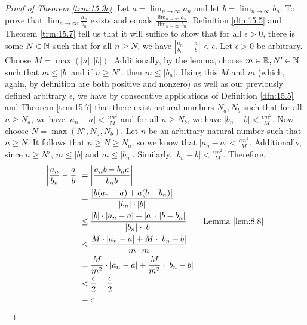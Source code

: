 \documentclass[../main.tex]{subfiles}
\begin{document}
\begin{theorem}
\begin{enumerate}[resume,label={\textup{(}\alph*\textup{)}},ref={\thetheorem\alph*}]
        \begin{proof}[Proof of Theorem \ref{trm:15.9c}]
            Let $a=\lim_{n\to\infty}a_n$ and let $b=\lim_{n\to\infty}b_n$. To prove that $\lim_{n\to\infty}\frac{a_n}{b_n}$ exists and equals $\frac{\lim_{n\to\infty}a_n}{\lim_{n\to\infty}b_n}$, Definition \ref{dfn:15.5} and Theorem \ref{trm:15.7} tell us that it will suffice to show that for all $\epsilon>0$, there is some $N\in\mathbb{N}$ such that for all $n\geq N$, we have $|\frac{a_n}{b_n}-\frac{a}{b}|<\epsilon$. Let $\epsilon>0$ be arbitrary. Choose $M=\max(|a|,|b|)$. Additionally, by the lemma, choose $m\in\mathbb{R},N'\in\mathbb{N}$ such that $m\leq|b|$ and if $n\geq N'$, then $m\leq|b_n|$. Using this $M$ and $m$ (which, again, by definition are both positive and nonzero) as well as our previously defined arbitrary $\epsilon$, we have by consecutive applications of Definition \ref{dfn:15.5} and Theorem \ref{trm:15.7} that there exist natural numbers $N_a,N_b$ such that for all $n\geq N_a$, we have $|a_n-a|<\frac{\epsilon m^2}{M}$ and for all $n\geq N_b$, we have $|b_n-b|<\frac{\epsilon m^2}{M}$. Now choose $N=\max(N',N_a,N_b)$. Let $n$ be an arbitrary natural number such that $n\geq N$. It follows that $n\geq N\geq N_a$, so we know that $|a_n-a|<\frac{\epsilon m^2}{M}$. Additionally, since $n\geq N'$, $m\leq|b|$ and $m\leq|b_n|$. Similarly, $|b_n-b|<\frac{\epsilon m^2}{M}$. Therefore,
            \begin{align*}
                \left| \frac{a_n}{b_n}-\frac{a}{b} \right| &= \left| \frac{a_nb-b_na}{b_nb} \right|\\
                &= \frac{|b(a_n-a)+a(b-b_n)|}{|b_n|\cdot|b|}\\
                &\leq \frac{|b|\cdot|a_n-a|+|a|\cdot|b-b_n|}{|b_n|\cdot|b|}\tag*{Lemma \ref{lem:8.8}}\\
                &\leq \frac{M\cdot|a_n-a|+M\cdot|b_n-b|}{m\cdot m}\\
                &= \frac{M}{m^2}\cdot|a_n-a|+\frac{M}{m^2}\cdot|b_n-b|\\
                &< \frac{\epsilon}{2}+\frac{\epsilon}{2}\\
                &= \epsilon
            \end{align*}
        \end{proof}
    \end{enumerate}
\end{theorem}
\end{document}
